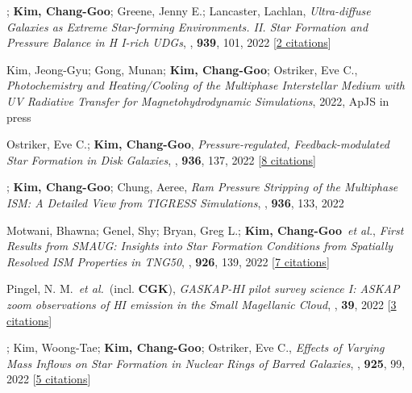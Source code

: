 \item[{43.}]; \textbf{Kim, Chang-Goo}; Greene, Jenny E.; Lancaster, Lachlan, \textit{Ultra-diffuse Galaxies as Extreme Star-forming Environments. II. Star Formation and Pressure Balance in H I-rich UDGs}, , \textbf{939}, 101, 2022 [\href{http://adsabs.harvard.edu/abs/2022ApJ...939..101K}{2 citations}]

\item[{42.}]Kim, Jeong-Gyu; Gong, Munan; \textbf{Kim, Chang-Goo}; Ostriker, Eve C., \textit{Photochemistry and Heating/Cooling of the Multiphase Interstellar Medium with UV Radiative Transfer for Magnetohydrodynamic Simulations}, 2022, ApJS in press

\item[{41.}]Ostriker, Eve C.; \textbf{Kim, Chang-Goo}, \textit{Pressure-regulated, Feedback-modulated Star Formation in Disk Galaxies}, , \textbf{936}, 137, 2022 [\href{http://adsabs.harvard.edu/abs/2022ApJ...936..137O}{8 citations}]

\item[{40.}]; \textbf{Kim, Chang-Goo}; Chung, Aeree, \textit{Ram Pressure Stripping of the Multiphase ISM: A Detailed View from TIGRESS Simulations}, , \textbf{936}, 133, 2022

\item[{39.}]Motwani, Bhawna; Genel, Shy; Bryan, Greg L.; \textbf{Kim, Chang-Goo}~\textit{et al.}, \textit{First Results from SMAUG: Insights into Star Formation Conditions from Spatially Resolved ISM Properties in TNG50}, , \textbf{926}, 139, 2022 [\href{http://adsabs.harvard.edu/abs/2022ApJ...926..139M}{7 citations}]

\item[{38.}]Pingel, N. M.~\textit{et al.}~(incl. \textbf{CGK}), \textit{GASKAP-HI pilot survey science I: ASKAP zoom observations of HI emission in the Small Magellanic Cloud}, , \textbf{39}, 2022 [\href{http://adsabs.harvard.edu/abs/2022PASA...39....5P}{3 citations}]

\item[{37.}]; Kim, Woong-Tae; \textbf{Kim, Chang-Goo}; Ostriker, Eve C., \textit{Effects of Varying Mass Inflows on Star Formation in Nuclear Rings of Barred Galaxies}, , \textbf{925}, 99, 2022 [\href{http://adsabs.harvard.edu/abs/2022ApJ...925...99M}{5 citations}]

